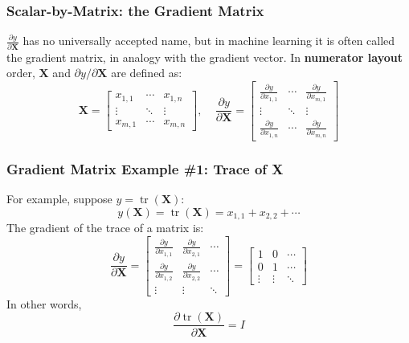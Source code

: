\documentclass{beamer}
\DeclareMathOperator{\tr}{tr}
\begin{document}
\begin{frame}
  \frametitle{Scalar-by-Matrix: the Gradient Matrix}

  $\frac{\partial y}{\partial\mathbf{X}}$ has no universally accepted
  name, but in machine learning it is often called the gradient
  matrix, in analogy with the gradient vector.  In {\bf numerator
    layout} order, $\mathbf{X}$ and $\partial y/\partial\mathbf{X}$
  are defined as:
  \begin{displaymath}
    \mathbf{X}=
    \left[\begin{array}{ccc}
        x_{1,1}&\cdots&x_{1,n}\\
        \vdots&\ddots&\vdots\\
        x_{m,1}&\cdots&x_{m,n}
      \end{array}\right],~~~~~
    \frac{\partial y}{\partial\mathbf{X}}=
    \left[\begin{array}{ccc}
        \frac{\partial y}{\partial x_{1,1}}&\cdots&\frac{\partial y}{\partial x_{m,1}}\\
        \vdots&\ddots&\vdots\\
        \frac{\partial y}{\partial x_{1,n}}&\cdots&\frac{\partial y}{\partial x_{m,n}}
      \end{array}\right]
  \end{displaymath}
\end{frame}

\begin{frame}
  \frametitle{Gradient Matrix Example \#1: Trace of X}

  For example, suppose $y=\tr(\mathbf{X})$:
  \begin{displaymath}
    y(\mathbf{X}) = \tr(\mathbf{X})= x_{1,1}+x_{2,2}+\cdots
  \end{displaymath}
  The gradient of the trace of a matrix is:
  \begin{displaymath}
    \frac{\partial y}{\partial\mathbf{X}} =
    \left[\begin{array}{ccc}
        \frac{\partial y}{\partial x_{1,1}}&
        \frac{\partial y}{\partial x_{2,1}}&
        \cdots\\
        \frac{\partial y}{\partial x_{1,2}}&
        \frac{\partial y}{\partial x_{2,2}}&
        \cdots\\
        \vdots&\vdots&\ddots
      \end{array}\right]=
    \left[\begin{array}{ccc}
        1&0&\cdots\\
        0&1&\cdots\\
        \vdots&\vdots&\ddots
      \end{array}\right]
  \end{displaymath}
  In other words,
  \begin{displaymath}
    \frac{\partial\tr(\mathbf{X})}{\partial\mathbf{X}} =I
  \end{displaymath}
\end{frame}
\end{document}
